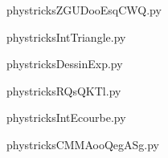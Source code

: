     \newcommand{\CaptionFigZGUDooEsqCWQ}{<+Type your caption here+>}
    \begin{center}
        
    \end{center}
    phystricksZGUDooEsqCWQ.py

    

    \clearpage
    


    \newcommand{\CaptionFigIntTriangle}{<+Type your caption here+>}
    \begin{center}
        
    \end{center}
    phystricksIntTriangle.py

    

    \clearpage
    


    \newcommand{\CaptionFigDessinExp}{<+Type your caption here+>}
    \begin{center}
        
    \end{center}
    phystricksDessinExp.py

    

    \clearpage
    


    \newcommand{\CaptionFigRQsQKTl}{<+Type your caption here+>}
    \begin{center}
        
    \end{center}
    phystricksRQsQKTl.py

    

    \clearpage
    


    \newcommand{\CaptionFigIntEcourbe}{<+Type your caption here+>}
    \begin{center}
        
    \end{center}
    phystricksIntEcourbe.py

    

    \clearpage
    


    \newcommand{\CaptionFigCMMAooQegASg}{<+Type your caption here+>}
    \begin{center}
        
    \end{center}
    phystricksCMMAooQegASg.py

